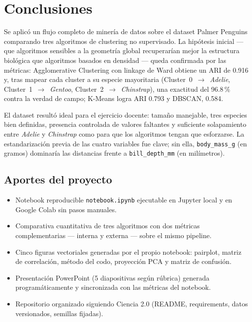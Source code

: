 \section{Conclusiones}

Se aplicó un flujo completo de minería de datos sobre el dataset Palmer Penguins comparando tres algoritmos de clustering no supervisado. La hipótesis inicial --- que algoritmos sensibles a la geometría global recuperarían mejor la estructura biológica que algoritmos basados en densidad --- queda confirmada por las métricas: Agglomerative Clustering con linkage de Ward obtiene un ARI de 0.916 y, tras mapear cada cluster a su especie mayoritaria (Cluster~0~$\to$~\emph{Adelie}, Cluster~1~$\to$~\emph{Gentoo}, Cluster~2~$\to$~\emph{Chinstrap}), una exactitud del 96.8\,\% contra la verdad de campo; K-Means logra ARI 0.793 y DBSCAN, 0.584.

El dataset resultó ideal para el ejercicio docente: tamaño manejable, tres especies bien definidas, presencia controlada de valores faltantes y suficiente solapamiento entre \emph{Adelie} y \emph{Chinstrap} como para que los algoritmos tengan que esforzarse. La estandarización previa de las cuatro variables fue clave; sin ella, \texttt{body\_mass\_g} (en gramos) dominaría las distancias frente a \texttt{bill\_depth\_mm} (en milímetros).

\subsection{Aportes del proyecto}

\begin{itemize}
  \item Notebook reproducible \texttt{notebook.ipynb} ejecutable en Jupyter local y en Google Colab sin pasos manuales.
  \item Comparativa cuantitativa de tres algoritmos con dos métricas complementarias --- interna y externa --- sobre el mismo pipeline.
  \item Cinco figuras vectoriales generadas por el propio notebook: pairplot, matriz de correlación, método del codo, proyección PCA y matriz de confusión.
  \item Presentación PowerPoint (5 diapositivas según rúbrica) generada programáticamente y sincronizada con las métricas del notebook.
  \item Repositorio organizado siguiendo Ciencia 2.0 (README, requirements, datos versionados, semillas fijadas).
\end{itemize}

